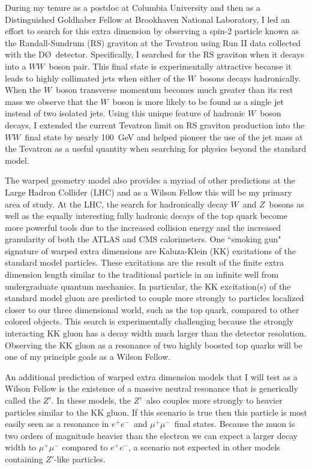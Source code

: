 \documentclass[12pt]{article}
\newcommand{\dzero}{D\O}
\begin{document}
During my tenure as a postdoc at Columbia University and then as a Distinguished Goldhaber Fellow at Brookhaven National Laboratory, I led an effort to search for this extra dimension by observing a spin-2 particle known as the Randall-Sundrum (RS) graviton at the Tevatron using Run II data collected with the \dzero~detector. Specifically, I searched for the RS graviton when it decays into a $WW$~boson pair. This final state is experimentally attractive because it leads to highly collimated jets when either of the $W$~bosons decays hadronically. When the $W$~boson transverse momentum becomes much greater than its rest mass we observe that the $W$~boson is more likely to be found as a single jet instead of two isolated jets. Using this unique feature of hadronic $W$~boson decays, I extended the current Tevatron limit on RS graviton production into the $WW$~final state by nearly 100~GeV and helped pioneer the use of the jet mass at the Tevatron as a useful quantity when searching for physics beyond the standard model. 

The warped geometry model also provides a myriad of other predictions at the Large Hadron Collider (LHC) and as a Wilson Fellow this will be my primary area of study. At the LHC, the search for hadronically decay $W$~and $Z$~bosons as well as the equally interesting fully hadronic decays of the top quark become more powerful tools due to the increased collision energy and the increased granularity of both the ATLAS and CMS calorimeters. One ``smoking gun" signature of warped extra dimensions are Kaluza-Klein (KK) excitations of the standard model particles. These excitations are the result of the finite extra dimension length similar to the traditional particle in an infinite well from undergraduate quantum mechanics. In particular, the KK excitation(s) of the standard model gluon are predicted to couple more strongly to particles localized closer to our three dimensional world, such as the top quark, compared to other colored objects. This search is experimentally challenging because the strongly interacting KK gluon has a decay width much larger than the detector resolution. Observing the KK gluon as a resonance of two highly boosted top quarks will be one of my principle goals as a Wilson Fellow.

An additional prediction of warped extra dimension models that I will test as a Wilson Fellow is the existence of a massive neutral resonance that is generically called the $Z'$. In these models, the $Z'$~also couples more strongly to heavier particles similar to the KK gluon. If this scenario is true then this particle is most easily seen as a resonance in $e^{+}e^{-}$~and $\mu^{+}\mu^{-}$~final states. Because the muon is two orders of magnitude heavier than the electron we can expect a larger decay width to $\mu^{+}\mu^{-}$ compared to $e^{+}e^{-}$, a scenario not expected in other models containing $Z'$-like particles.
\end{document}
